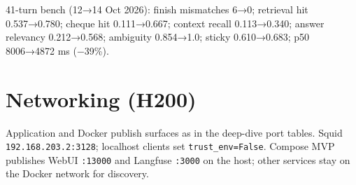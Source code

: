 41-turn bench (12→14 Oct 2026): finish mismatches 6→0; retrieval hit 0.537→0.780; cheque hit 0.111→0.667; context recall 0.113→0.340; answer relevancy 0.212→0.568; ambiguity 0.854→1.0; sticky 0.610→0.683; p50 8006→4872 ms (−39\%).

\section{Networking (H200)}\label{networking-h200}

Application and Docker publish surfaces as in the deep-dive port tables. Squid \texttt{192.168.203.2:3128}; localhost clients set \texttt{trust\_env=False}. Compose MVP publishes WebUI \texttt{:13000} and Langfuse \texttt{:3000} on the host; other services stay on the Docker network for discovery.
